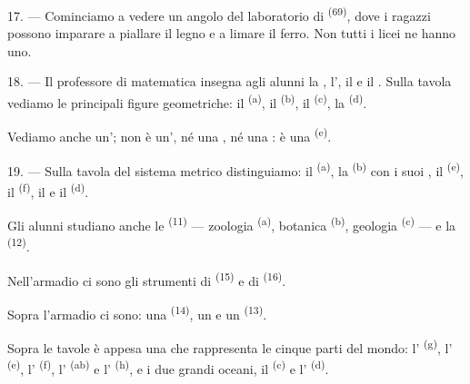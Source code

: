 17. --- Cominciamo a vedere un angolo del laboratorio di 
\textsuperscript{(69)}, dove i ragazzi possono imparare a piallare il legno e a
limare il ferro. Non tutti i licei ne hanno uno.

\VUsaut{5.0mm}
\VUsaut{3.6mm}

18. --- Il professore di matematica insegna agli alunni la ,
l', il  e il . Sulla
tavola vediamo le principali figure geometriche: il 
\textsuperscript{(a)}, il  \textsuperscript{(b)}, il
 \textsuperscript{(c)}, la  \textsuperscript{(d)}.

Vediamo anche un'; non è un', né una
, né una : è una 
\textsuperscript{(e)}.

19. --- Sulla tavola del sistema metrico distinguiamo: il 
\textsuperscript{(a)}, la  \textsuperscript{(b)} con i suoi
, il  \textsuperscript{(e)}, il 
\textsuperscript{(f)}, il  e il 
\textsuperscript{(d)}.

Gli alunni studiano anche le  \textsuperscript{(11)} ---
zoologia \textsuperscript{(a)}, botanica \textsuperscript{(b)}, geologia
\textsuperscript{(c)} --- e la  \textsuperscript{(12)}.

Nell'armadio ci sono gli strumenti di  \textsuperscript{(15)} e di
 \textsuperscript{(16)}.

Sopra l'armadio ci sono: una  \textsuperscript{(14)}, un  e
un  \textsuperscript{(13)}.

Sopra le tavole è appesa una  che rappresenta le cinque parti del
mondo: l' \textsuperscript{(g)}, l'
\textsuperscript{(e)}, l' \textsuperscript{(f)}, l'
\textsuperscript{(ab)} e l' \textsuperscript{(h)}, e i due grandi
oceani, il  \textsuperscript{(c)} e l'
\textsuperscript{(d)}.
\VUsaut{6.0mm}
\VUfilet{22mm}
